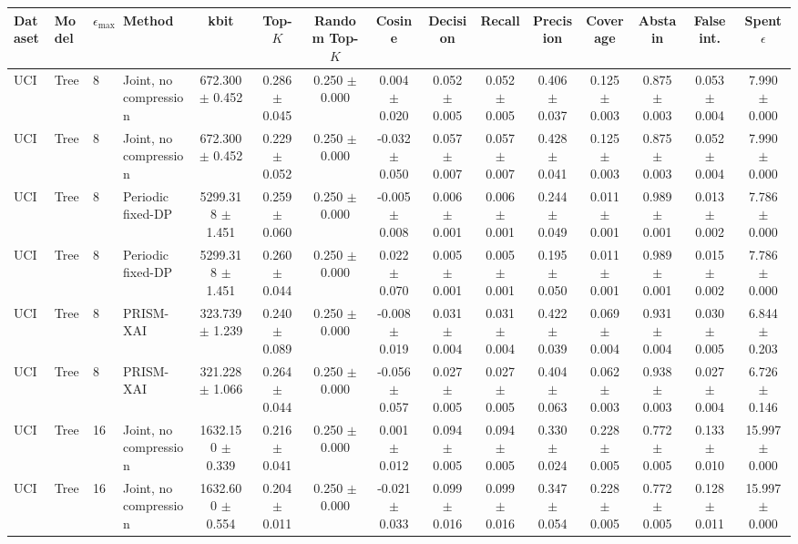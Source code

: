 \begin{tabular}{llllccccccccccc}
\toprule
Dataset & Model & $\epsilon_{\max}$ & Method & kbit & Top-$K$ & Random Top-$K$ & Cosine & Decision & Recall & Precision & Coverage & Abstain & False int. & Spent $\epsilon$ \\
\midrule
UCI & Tree & 8 & Joint, no compression & 672.300 $\pm$ 0.452 & 0.286 $\pm$ 0.045 & 0.250 $\pm$ 0.000 & 0.004 $\pm$ 0.020 & 0.052 $\pm$ 0.005 & 0.052 $\pm$ 0.005 & 0.406 $\pm$ 0.037 & 0.125 $\pm$ 0.003 & 0.875 $\pm$ 0.003 & 0.053 $\pm$ 0.004 & 7.990 $\pm$ 0.000 \\
UCI & Tree & 8 & Joint, no compression & 672.300 $\pm$ 0.452 & 0.229 $\pm$ 0.052 & 0.250 $\pm$ 0.000 & -0.032 $\pm$ 0.050 & 0.057 $\pm$ 0.007 & 0.057 $\pm$ 0.007 & 0.428 $\pm$ 0.041 & 0.125 $\pm$ 0.003 & 0.875 $\pm$ 0.003 & 0.052 $\pm$ 0.004 & 7.990 $\pm$ 0.000 \\
UCI & Tree & 8 & Periodic fixed-DP & 5299.318 $\pm$ 1.451 & 0.259 $\pm$ 0.060 & 0.250 $\pm$ 0.000 & -0.005 $\pm$ 0.008 & 0.006 $\pm$ 0.001 & 0.006 $\pm$ 0.001 & 0.244 $\pm$ 0.049 & 0.011 $\pm$ 0.001 & 0.989 $\pm$ 0.001 & 0.013 $\pm$ 0.002 & 7.786 $\pm$ 0.000 \\
UCI & Tree & 8 & Periodic fixed-DP & 5299.318 $\pm$ 1.451 & 0.260 $\pm$ 0.044 & 0.250 $\pm$ 0.000 & 0.022 $\pm$ 0.070 & 0.005 $\pm$ 0.001 & 0.005 $\pm$ 0.001 & 0.195 $\pm$ 0.050 & 0.011 $\pm$ 0.001 & 0.989 $\pm$ 0.001 & 0.015 $\pm$ 0.002 & 7.786 $\pm$ 0.000 \\
UCI & Tree & 8 & PRISM-XAI & 323.739 $\pm$ 1.239 & 0.240 $\pm$ 0.089 & 0.250 $\pm$ 0.000 & -0.008 $\pm$ 0.019 & 0.031 $\pm$ 0.004 & 0.031 $\pm$ 0.004 & 0.422 $\pm$ 0.039 & 0.069 $\pm$ 0.004 & 0.931 $\pm$ 0.004 & 0.030 $\pm$ 0.005 & 6.844 $\pm$ 0.203 \\
UCI & Tree & 8 & PRISM-XAI & 321.228 $\pm$ 1.066 & 0.264 $\pm$ 0.044 & 0.250 $\pm$ 0.000 & -0.056 $\pm$ 0.057 & 0.027 $\pm$ 0.005 & 0.027 $\pm$ 0.005 & 0.404 $\pm$ 0.063 & 0.062 $\pm$ 0.003 & 0.938 $\pm$ 0.003 & 0.027 $\pm$ 0.004 & 6.726 $\pm$ 0.146 \\
UCI & Tree & 16 & Joint, no compression & 1632.150 $\pm$ 0.339 & 0.216 $\pm$ 0.041 & 0.250 $\pm$ 0.000 & 0.001 $\pm$ 0.012 & 0.094 $\pm$ 0.005 & 0.094 $\pm$ 0.005 & 0.330 $\pm$ 0.024 & 0.228 $\pm$ 0.005 & 0.772 $\pm$ 0.005 & 0.133 $\pm$ 0.010 & 15.997 $\pm$ 0.000 \\
UCI & Tree & 16 & Joint, no compression & 1632.600 $\pm$ 0.554 & 0.204 $\pm$ 0.011 & 0.250 $\pm$ 0.000 & -0.021 $\pm$ 0.033 & 0.099 $\pm$ 0.016 & 0.099 $\pm$ 0.016 & 0.347 $\pm$ 0.054 & 0.228 $\pm$ 0.005 & 0.772 $\pm$ 0.005 & 0.128 $\pm$ 0.011 & 15.997 $\pm$ 0.000 \\

\end{tabular}
